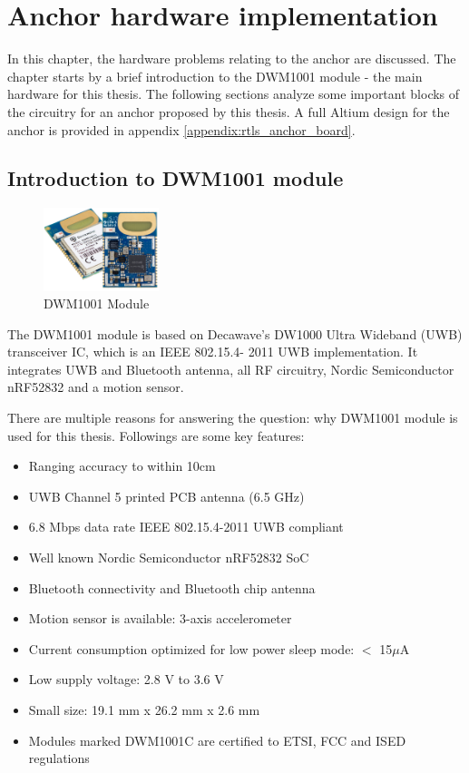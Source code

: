 \documentclass[\main/main.tex]{subfiles}
\begin{document}
\graphicspath{{img/}{04_hardware/img/}}
\setlength{\abovecaptionskip}{0pt}
\setlength{\belowcaptionskip}{0pt}

\chapter{Anchor hardware implementation}
In this chapter, the hardware problems relating to the anchor are discussed. The chapter starts by a brief introduction to the DWM1001 module - the main hardware for this thesis. The following sections analyze some important blocks of the circuitry for an anchor proposed by this thesis. A full Altium design for the anchor is provided in appendix \ref{appendix:rtls_anchor_board}.

\section{Introduction to DWM1001 module}
\begin{figure}[H]
    \begin{center}
        \includegraphics[width=0.3\textwidth]{DWM1001-Module_ProdPage_600x430.jpg}
    \end{center}
    \caption{DWM1001 Module}
    \label{fig:dwm1001c_module}
\end{figure}

The DWM1001 module is based on Decawave's DW1000 Ultra
Wideband (UWB) transceiver IC, which is an IEEE 802.15.4-
2011 UWB implementation. It integrates UWB and Bluetooth
antenna, all RF circuitry, Nordic Semiconductor nRF52832 and
a motion sensor.

There are multiple reasons for answering the question: why DWM1001 module is used for this thesis.
Followings are some key features:
\begin{itemize}
    \item Ranging accuracy to within 10cm
    \item UWB Channel 5 printed PCB antenna (6.5 GHz)
    \item 6.8 Mbps data rate IEEE 802.15.4-2011 UWB compliant
    \item Well known Nordic Semiconductor nRF52832 SoC
    \item Bluetooth connectivity and Bluetooth chip antenna
    \item Motion sensor is available: 3-axis accelerometer
    \item Current consumption optimized for low power sleep mode: $<$ 15$\mu$A
    \item Low supply voltage: 2.8 V to 3.6 V
    \item Small size: 19.1 mm x 26.2 mm x 2.6 mm
    \item Modules marked DWM1001C are certified to ETSI, FCC and ISED regulations
\end{itemize}
\end{document}
